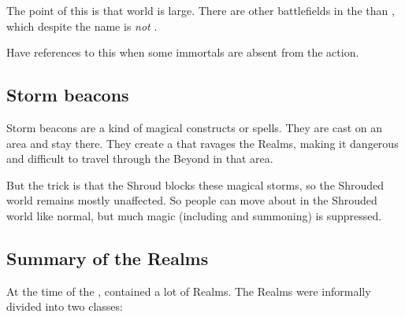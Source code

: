 The point of this is that world is large. 
There are other battlefields in the  than \Azmith, which despite the name is \emph{not} . 

Have references to this when some immortals are absent from the action. 









\subsection{Storm beacons}
Storm beacons are a kind of magical constructs or spells. 
They are cast on an area and stay there. 
They create a  that ravages the Realms, making it dangerous and difficult to travel through the Beyond in that area. 

But the trick is that the Shroud blocks these magical storms, so the Shrouded world remains mostly unaffected. 
So people can move about in the Shrouded world like normal, but much magic (including  and summoning) is suppressed. 









\subsection{Summary of the Realms}
At the time of the \thirdbanewar, \Miith contained a lot of Realms. 
The \Miithian{} Realms were informally divided into two classes: 

